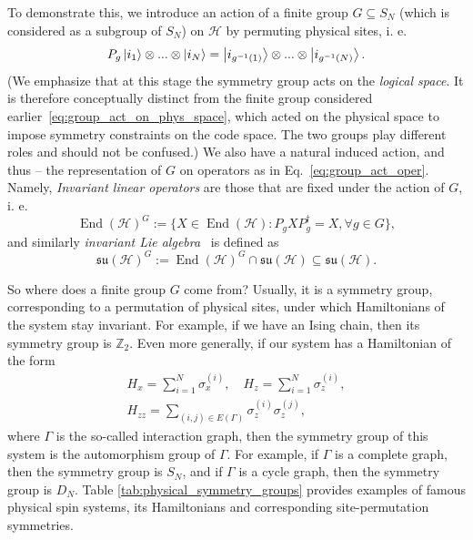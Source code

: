 \documentclass[10pt,twocolumn,superscriptaddress,aps,amsmath,amssymb,citeautoscript,floatfix,prx,longbibliography]{revtex4-2}
\newcounter{alg}
\theoremstyle{plain}
\theoremstyle{plain}
\theoremstyle{plain}
\theoremstyle{plain}
\theoremstyle{plain}
\theoremstyle{plain}
\begin{document}
To demonstrate this, we introduce an action of a finite group $G \subseteq S_N$ (which is considered as a subgroup of $S_N$) on $\mathcal{H}$ by permuting physical sites, i. e.
\[
    P_g\ket{i_1}\otimes...\otimes\ket{i_N}=\ket{i_{g^{-1}(1)}}\otimes...\otimes\ket{i_{g^{-1}(N)}}.
\]
(We emphasize that at this stage the symmetry group acts on the \textit{logical space}. It is therefore conceptually distinct from the finite group considered earlier~\eqref{eq:group_act_on_phys_space}, which acted on the physical space to impose symmetry constraints on the code space. The two groups play different roles and should not be confused.) 
We also have a natural induced action, and thus -- the representation of $G$ on operators as in Eq.~\eqref{eq:group_act_oper}. Namely,     \textit{Invariant linear operators} are those that are fixed under the action of $G$, i. e. 
    \begin{equation}
        \operatorname{End}(\mathcal{H})^G := \{ X \in \operatorname{End}(\mathcal{H}) : P_g X P_g^{\dagger} = X, \forall g \in G \},
    \end{equation}
    and similarly \textit{invariant Lie algebra}~\cite{DAlessandroHartwig2021, Albertini2020} is defined as
    \begin{equation}
        \mathfrak{su}(\mathcal{H})^G := \operatorname{End}(\mathcal{H})^G \cap \mathfrak{su}(\mathcal{H}) \subseteq \mathfrak{su}(\mathcal{H}).
    \end{equation}

So where does a finite group $G$ come from? Usually, it is a symmetry group, corresponding to a permutation of physical sites, under which Hamiltonians of the system stay invariant. For example, if we have an Ising chain, then its symmetry group is $\mathbb{Z}_2$. Even more generally, if our system has a Hamiltonian of the form
\begin{equation}
\begin{gathered}
    H_x=\sum_{i=1}^N \sigma_x^{(i)}, \quad H_z=\sum_{i=1}^N \sigma_z^{(i)}, \\ H_{zz}=\sum_{(i, j)\in E(\Gamma)} \sigma_z^{(i)} \sigma_z^{(j)},
\end{gathered}
\end{equation}
where $\Gamma$ is the so-called interaction graph, then the symmetry group of this system is the automorphism group of $\Gamma$.
For example, if $\Gamma$ is a complete graph, then the symmetry group is $S_N$, and if $\Gamma$ is a cycle graph, then the symmetry group is $D_N$. Table \ref{tab:physical_symmetry_groups} provides examples of famous physical spin systems, its Hamiltonians and corresponding site-permutation symmetries.
\end{document}
